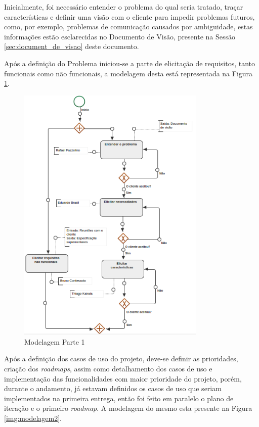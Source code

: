 
Inicialmente, foi necessário entender o problema do qual seria tratado, traçar características e definir uma visão com o cliente para impedir problemas futuros, como, por exemplo, problemas de comunicação causados por ambiguidade, estas informações estão esclarecidas no Documento de Visão, presente na Sessão \ref{sec:document_de_visao} deste documento.

Após a definição do Problema iniciou-se a parte de elicitação de requisitos, tanto funcionais como não funcionais, a modelagem desta está representada na Figura \ref{img:modelagem1}.

\begin{figure}[H]
	\centering
	\includegraphics[width=0.8\textwidth]{imgModelagem/modelagem1}
	\caption{Modelagem Parte 1}
	\label{img:modelagem1}
\end{figure}


Após a definição dos casos de uso do projeto, deve-se definir as prioridades, criação dos \textit{roadmaps}, assim como detalhamento dos casos de uso e implementação das funcionalidades com maior prioridade do projeto, porém, durante o andamento, já estavam definidos os casos de uso que seriam implementados na primeira entrega, então foi feito em paralelo o plano de iteração e o primeiro \textit{roadmap}. A modelagem do mesmo esta presente na Figura \ref{img:modelagem2}.

